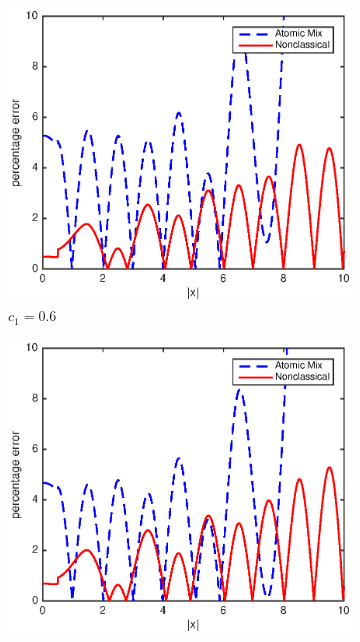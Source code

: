 \documentclass[12pt]{article}
\begin{document}
{\begin{figure}[p]
    \centering
    \begin{subfigure}{0.495\textwidth}
        \centering
        \includegraphics[width=\textwidth]{NSE_err_B60.eps}
        \caption{$c_1 = 0.6$}
        \label{figerrB60}
    \end{subfigure}
    \hfill
    \begin{subfigure}{0.495\textwidth}
        \centering
        \includegraphics[width=\textwidth]{NSE_err_B70.eps}

\end{subfigure}
\end{figure}}
\end{document}
